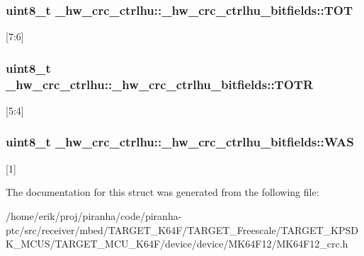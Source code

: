 \subsubsection[{\texorpdfstring{T\+OT}{TOT}}]{\setlength{\rightskip}{0pt plus 5cm}uint8\+\_\+t \+\_\+hw\+\_\+crc\+\_\+ctrlhu\+::\+\_\+hw\+\_\+crc\+\_\+ctrlhu\+\_\+bitfields\+::\+T\+OT}\hypertarget{struct__hw__crc__ctrlhu_1_1__hw__crc__ctrlhu__bitfields_a3b2d9b73096f2c21806e2ef93632489a}{}\label{struct__hw__crc__ctrlhu_1_1__hw__crc__ctrlhu__bitfields_a3b2d9b73096f2c21806e2ef93632489a}
\mbox{[}7\+:6\mbox{]} 
\subsubsection[{\texorpdfstring{T\+O\+TR}{TOTR}}]{\setlength{\rightskip}{0pt plus 5cm}uint8\+\_\+t \+\_\+hw\+\_\+crc\+\_\+ctrlhu\+::\+\_\+hw\+\_\+crc\+\_\+ctrlhu\+\_\+bitfields\+::\+T\+O\+TR}\hypertarget{struct__hw__crc__ctrlhu_1_1__hw__crc__ctrlhu__bitfields_aca31e0c915189eee1ecb053032c2c8c4}{}\label{struct__hw__crc__ctrlhu_1_1__hw__crc__ctrlhu__bitfields_aca31e0c915189eee1ecb053032c2c8c4}
\mbox{[}5\+:4\mbox{]} 
\subsubsection[{\texorpdfstring{W\+AS}{WAS}}]{\setlength{\rightskip}{0pt plus 5cm}uint8\+\_\+t \+\_\+hw\+\_\+crc\+\_\+ctrlhu\+::\+\_\+hw\+\_\+crc\+\_\+ctrlhu\+\_\+bitfields\+::\+W\+AS}\hypertarget{struct__hw__crc__ctrlhu_1_1__hw__crc__ctrlhu__bitfields_ab077eef77784fc25650fb89e8e2879af}{}\label{struct__hw__crc__ctrlhu_1_1__hw__crc__ctrlhu__bitfields_ab077eef77784fc25650fb89e8e2879af}
\mbox{[}1\mbox{]} 

The documentation for this struct was generated from the following file\+:\begin{DoxyCompactItemize}
\item 
/home/erik/proj/piranha/code/piranha-\/ptc/src/receiver/mbed/\+T\+A\+R\+G\+E\+T\+\_\+\+K64\+F/\+T\+A\+R\+G\+E\+T\+\_\+\+Freescale/\+T\+A\+R\+G\+E\+T\+\_\+\+K\+P\+S\+D\+K\+\_\+\+M\+C\+U\+S/\+T\+A\+R\+G\+E\+T\+\_\+\+M\+C\+U\+\_\+\+K64\+F/device/device/\+M\+K64\+F12/M\+K64\+F12\+\_\+crc.\+h\end{DoxyCompactItemize}
